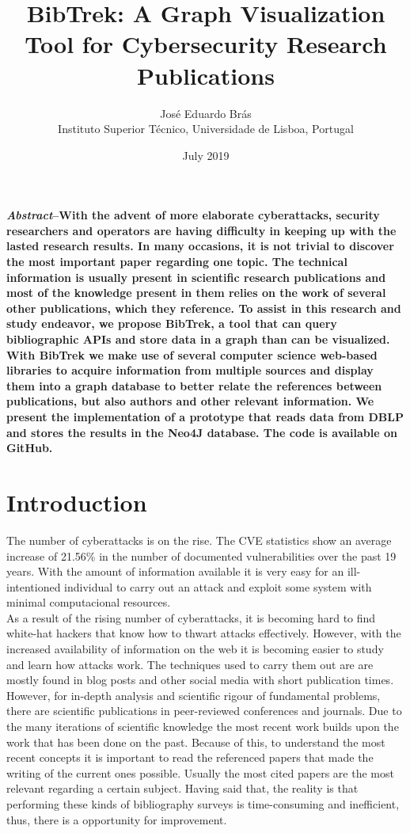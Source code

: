 \documentclass[twocolumn]{article}
\begin{document}
\title{\textbf{BibTrek: A Graph Visualization Tool for Cybersecurity Research Publications}}
\date{}
\author{Jos\'{e} Eduardo Br\'{a}s\\Instituto Superior T\'{e}cnico, Universidade de Lisboa, Portugal}
\date{July 2019}
\maketitle

\textbf{\textit{Abstract}--With the advent of more elaborate cyberattacks, security researchers and operators are having difficulty in keeping up with the lasted research results. In many occasions, it is not trivial to discover the most important paper regarding one topic. The technical information is usually present in scientific research publications and most of the knowledge present in them relies on the work of several other publications, which they reference. To assist in this research and study endeavor, we propose BibTrek, a tool that can query bibliographic APIs and store data in a graph than can be visualized. With BibTrek we make use of several computer science web-based libraries to acquire information from multiple sources and display them into a graph database to better relate the references between publications, but also authors and other relevant information. We present the implementation of a prototype that reads data from DBLP and stores the results in the Neo4J database. The code is available on GitHub.}

\section{Introduction}

The number of cyberattacks is on the rise. The CVE statistics \cite{cvestatisticsbyyear} show an average increase of 21.56\% in the number of documented vulnerabilities over the past 19 years. With the amount of information available it is very easy for an ill-intentioned individual to carry out an attack and exploit some system with minimal computacional resources. 
\\[1\baselineskip]
As a result of the rising number of cyberattacks, it is becoming hard to find white-hat hackers that know how to thwart attacks effectively. However, with the increased availability of information on the web it is becoming easier to study and learn how attacks work. The techniques used to carry them out are are mostly found in blog posts and other social media with short publication times. However, for in-depth analysis and scientific rigour of fundamental problems, there are scientific publications in peer-reviewed conferences and journals. Due to the many iterations of scientific knowledge the most recent work builds upon the work that has been done on the past. Because of this, to understand the most recent concepts it is important to read the referenced papers that made the writing of the current ones possible. Usually the most cited papers are the most relevant regarding a certain subject. Having said that, the reality is that performing these kinds of bibliography surveys is time-consuming and inefficient, thus, there is a opportunity for improvement.
\end{document}

